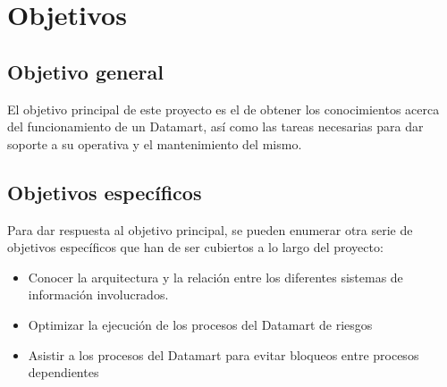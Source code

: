 \documentclass[a4paper, 12pt]{book}
\begin{document}

\cleardoublepage
\chapter{Objetivos}
\label{chap:objetivos}

\section{Objetivo general}
\label{sec:objetivo-general}
El objetivo principal de este proyecto es el de obtener los conocimientos acerca del funcionamiento de un Datamart, así como las tareas necesarias para dar soporte a su operativa y el mantenimiento del mismo.

\section{Objetivos específicos}
\label{sec:objetivos-especificos}
Para dar respuesta al objetivo principal, se pueden enumerar otra serie de objetivos específicos que han de ser cubiertos a lo largo del proyecto:

\begin{itemize}
	\item Conocer la arquitectura y la relación entre los diferentes sistemas de información involucrados.
	
	\item Optimizar la ejecución de los procesos del Datamart de riesgos
	
	\item Asistir a los procesos del Datamart para evitar bloqueos entre procesos dependientes
\end{itemize}




\end{document}
